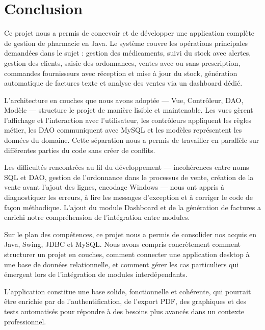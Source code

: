 \documentclass[12pt,a4paper]{report}
\begin{document}
\chapter{Conclusion}

Ce projet nous a permis de concevoir et de développer une application complète de gestion de pharmacie en Java. Le système couvre les opérations principales demandées dans le sujet : gestion des médicaments, suivi du stock avec alertes, gestion des clients, saisie des ordonnances, ventes avec ou sans prescription, commandes fournisseurs avec réception et mise à jour du stock, génération automatique de factures texte et analyse des ventes via un dashboard dédié.

L'architecture en couches que nous avons adoptée --- Vue, Contrôleur, DAO, Modèle --- structure le projet de manière lisible et maintenable. Les vues gèrent l'affichage et l'interaction avec l'utilisateur, les contrôleurs appliquent les règles métier, les DAO communiquent avec MySQL et les modèles représentent les données du domaine. Cette séparation nous a permis de travailler en parallèle sur différentes parties du code sans créer de conflits.

Les difficultés rencontrées au fil du développement --- incohérences entre noms SQL et DAO, gestion de l'ordonnance dans le processus de vente, création de la vente avant l'ajout des lignes, encodage Windows --- nous ont appris à diagnostiquer les erreurs, à lire les messages d'exception et à corriger le code de façon méthodique. L'ajout du module Dashboard et de la génération de factures a enrichi notre compréhension de l'intégration entre modules.

Sur le plan des compétences, ce projet nous a permis de consolider nos acquis en Java, Swing, JDBC et MySQL. Nous avons compris concrètement comment structurer un projet en couches, comment connecter une application desktop à une base de données relationnelle, et comment gérer les cas particuliers qui émergent lors de l'intégration de modules interdépendants.

L'application constitue une base solide, fonctionnelle et cohérente, qui pourrait être enrichie par de l'authentification, de l'export PDF, des graphiques et des tests automatisés pour répondre à des besoins plus avancés dans un contexte professionnel.

\end{document}

